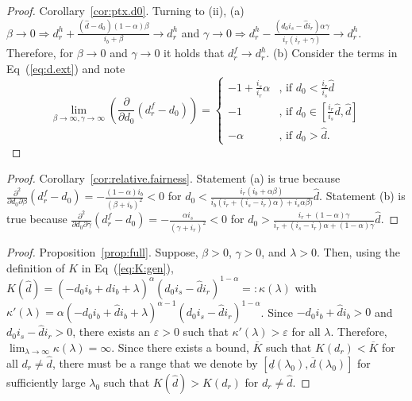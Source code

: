\documentclass[a4paper,11pt]{article}
\newcommand{\dref}{\widehat d}
\newcommand{\dHyp}{d^h_r}
\renewcommand{\~}[1]{\tilde{#1}}
\renewcommand{\-}[1]{\overline{#1}}
\begin{document}
\begin{appendices}
\begin{proof}{Corollary~\ref{cor:ptx.d0}.}
Turning to (ii), (a) $\beta\rightarrow 0\Rightarrow \dHyp + \frac{(\dref-d_0) (1 - \alpha) \beta}{i_b + \beta}\rightarrow\dHyp$ and 
  $\gamma\rightarrow 0\Rightarrow \dHyp-\frac{(d_0 i_s-\dref i_r) \alpha \gamma}{i_r (i_r + \gamma)}\rightarrow\dHyp$. Therefore, for $\beta\rightarrow 0$ and $\gamma\rightarrow 0$ it holds that $d_r^f\rightarrow\dHyp$. (b) Consider the terms in Eq~(\ref{eq:d.ext}) and note  $$
  \lim_{\beta\rightarrow\infty,\gamma\rightarrow\infty}
        \left(\frac{\partial}{\partial d_0}\left(d_r^f-d_0\right)\right) = \begin{cases}
        -1+\frac{i_s}{i_r}\alpha
  & \text{, if } d_0 < \frac{ i_r }{i_s}\dref\\
  -1 & \text{, if }d_0\in\left[\frac{ i_r }{i_s}\dref,\dref\right]\\
-\alpha& \text{, if } d_0 >\dref.
        \end{cases}
  $$
  
\end{proof}

\begin{proof}{Corollary~\ref{cor:relative.fairness}.}
Statement (a) is true because $\frac{\partial^2}{\partial d_0\partial\beta}\left(d_r^f-d_0\right)=-\frac{(1-\alpha) i_b}{(\beta +i_b)^2}<0$ for $d_0 < \frac{ i_r (i_b + \alpha \beta)}{  i_b (i_r + \left(i_s- i_r\right) \alpha) + i_s \alpha \beta)}\dref$. Statement (b) is true because $\frac{\partial^2}{\partial d_0\partial\gamma}\left(d_r^f-d_0\right)= -\frac{\alpha  i_s}{(\gamma +i_r)^2}<0 $ for $ d_0 >\frac{ i_r + \left(1- \alpha\right) \gamma}{i_r + (i_s-i_r) \alpha + (1-\alpha)\gamma}\dref$.
\end{proof}

\begin{proof}{Proposition~\ref{prop:full}.}
Suppose, $\beta>0$, $\gamma>0$, and $\lambda>0$. Then, using the definition of $K$ in Eq~(\ref{eq:K:gen}), $K(\dref)=(-d_0 i_b+\dref i_b+\lambda )^{\alpha } (d_0 i_s-\dref i_r)^{1-\alpha }=:\kappa\left(\lambda\right)$ with $\kappa'\left(\lambda\right)=\alpha  (-d_0 i_b+\dref i_b+\lambda )^{\alpha -1} (d_0 i_s-\dref i_r)^{1-\alpha}$. Since $-d_0 i_b+\dref i_b>0$ and $d_0 i_s-\dref i_r>0$, there exists an $\varepsilon>0$ such that $\kappa'\left(\lambda\right)>\varepsilon$ for all $\lambda$. Therefore, $\lim_{\lambda\rightarrow\infty}\kappa\left(\lambda\right)=\infty$. Since there exists a bound, $\overline K$ such that $K(d_r)<\overline K$ for all $d_r\neq\dref$, there must be a range that we denote by $\left[\underline{d}\left(\lambda_0\right),\overline{d}\left(\lambda_0\right)\right]$ for sufficiently large $\lambda_0$ such that $K(\dref)>K(d_r)$ for $d_r\neq \dref$.
\end{proof}



\end{appendices}
\end{document}
